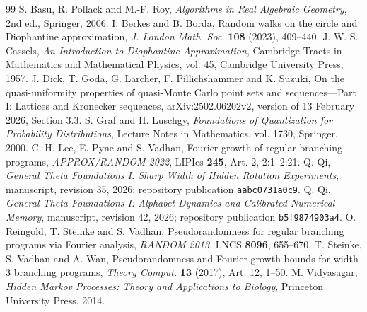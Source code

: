 \begin{thebibliography}{99}
 S. Basu, R. Pollack and M.-F. Roy,
\emph{Algorithms in Real Algebraic Geometry}, 2nd ed., Springer, 2006.
 I. Berkes and B. Borda,
Random walks on the circle and Diophantine approximation,
\emph{J. London Math. Soc.} \textbf{108} (2023), 409--440.
 J. W. S. Cassels,
\emph{An Introduction to Diophantine Approximation}, Cambridge Tracts in Mathematics and Mathematical Physics, vol. 45, Cambridge University Press, 1957.
 J. Dick, T. Goda, G. Larcher, F. Pillichshammer and K. Suzuki,
On the quasi-uniformity properties of quasi-Monte Carlo point sets and sequences---Part I: Lattices and Kronecker sequences,
arXiv:2502.06202v2, version of 13 February 2026, Section 3.3.
 S. Graf and H. Luschgy,
\emph{Foundations of Quantization for Probability Distributions}, Lecture Notes in Mathematics, vol. 1730, Springer, 2000.
 C. H. Lee, E. Pyne and S. Vadhan,
Fourier growth of regular branching programs,
\emph{APPROX/RANDOM 2022}, LIPIcs \textbf{245}, Art. 2, 2:1--2:21.
 Q. Qi,
\emph{General Theta Foundations I: Sharp Width of Hidden Rotation Experiments}, manuscript, revision 35, 2026; repository publication \texttt{aabc0731a0c9}.
 Q. Qi,
\emph{General Theta Foundations I: Alphabet Dynamics and Calibrated Numerical Memory}, manuscript, revision 42, 2026; repository publication \texttt{b5f9874903a4}.
 O. Reingold, T. Steinke and S. Vadhan,
Pseudorandomness for regular branching programs via Fourier analysis,
\emph{RANDOM 2013}, LNCS \textbf{8096}, 655--670.
 T. Steinke, S. Vadhan and A. Wan,
Pseudorandomness and Fourier growth bounds for width 3 branching programs,
\emph{Theory Comput.} \textbf{13} (2017), Art. 12, 1--50.
 M. Vidyasagar,
\emph{Hidden Markov Processes: Theory and Applications to Biology}, Princeton University Press, 2014.
\end{thebibliography}
